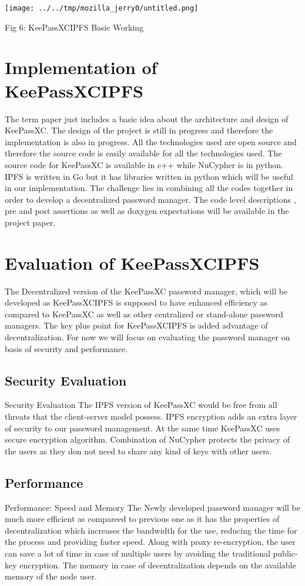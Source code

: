 \documentclass[12pt]{article}
\begin{document}
\texttt{[image: ../../tmp/mozilla\_jerry0/untitled.png]}
  
\caption{Fig 6: KeePassXCIPFS Basic Working}


\section{Implementation of KeePassXCIPFS}

	
		The term paper just includes a basic idea about the architecture and design of KeePassXC. The design of the project is still in progress and therefore the implementation is also in progress. All the technologies used are open source and therefore the source code is easily available for all the technologies used. The source code for KeePassXC is available in c++ while NuCypher is in python. IPFS is written in Go but it has libraries written in python which will be useful in our implementation. The challenge lies in combining all the codes together in order to develop a decentralized password manager.  The code level descriptions , pre and post assertions as well as doxygen expectations will be available in the project paper. 
 
\section{Evaluation of KeePassXCIPFS}
The Decentralized version of the KeePassXC password manager, which will be developed as  KeePassXCIPFS is supposed to have enhanced efficiency as compared to KeePassXC as well as other centralized or stand-alone password managers. The key plus point for KeePassXCIPFS is added advantage of decentralization.  For now we will focus on evaluating the password manager on basis of security and performance.

\subsection{Security Evaluation}
         Security Evaluation
           The IPFS version of KeePassXC would be free from all threats that the client-server model possess. IPFS encryption adds an extra layer of security to our password management. At the same time KeePassXC uses secure encryption algorithm. Combination of NuCypher protects the privacy of the users as they don not need to share any kind of keys with other users.  

\subsection{Performance}
         Performance: Speed and Memory
           The Newly developed password manager will be much more efficient as compareed to previous one as it has the properties of decentralization which increases the bandwidth for the use, reducing the time for the process and providing faster speed. Along with proxy re-encryption, the user can save a lot of time in case of multiple users by avoiding the traditional public-key encryption. The memory in case of decentralization depends on the available memory of the node user.
          
\end{document}
